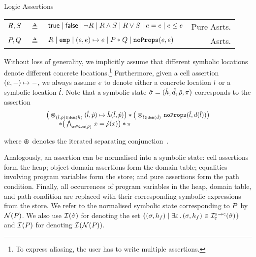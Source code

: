 
\vspace{2pt}
\begin{display}{\jsil Logic Assertions}
%
{\small
\begin{tabular}{r@{\ }c@{\ }lr}
  $R, S$ & $\triangleq$ & ${\sf true} \mid {\sf false} \mid  \neg R \mid R \land S \mid R \lor S \mid e = e \mid e \leq e$ & Pure Asrts. \\
  $P, Q$ & $\triangleq$ & $R \mid \texttt{emp} \mid (e, e)\mapsto e \mid P \mathbin{*} Q \mid \texttt{noProps}(e, e)$ & Asrts.
\end{tabular}}
\end{display}

\noindent Without loss of generality, we implicitly assume that different symbolic locations 
denote different concrete locations.\footnote{To express aliasing, the user has to write multiple assertions.}
 Furthermore, given a cell assertion $(e,-) \mapsto -$, we always assume 
 $e$ to denote either a concrete location $l$ or a symbolic location $\hat{l}$. 
%
Note that 
a symbolic state $\hat{\sigma} = (\hat{h}, \hat{d}, \hat\rho, \pi)$ corresponds to the assertion 
\begin{equation*}
{\small \begin{array}{l}
\big(\varoast_{(\sloc, \sexprp) \in \domain(\sheap)} (\sloc, \sexprp) \mapsto \sheap(\sloc, \sexprp)\big) 
  \sep \big(\varoast_{\sloc \in \domain(\sdom)} \, \emptyfields{\sloc}{\idom(\sloc)}\big)  \\
 \qquad \sep \big(\bigwedge_{\jvar \in \domain(\sstore)} \, \jvar = \sstore(\jvar)\big) \sep \pc
\end{array}}
\end{equation*}

\noindent where $\varoast$ denotes the iterated separating conjunction~\cite{citeme}. 


Analogously, an assertion can be normalised into a symbolic state: 
 cell assertions form the heap; 
object domain assertions form the domain table;
 equalities involving program variables form the store; and 
 pure assertions form the path condition. 
Finally,  all occurrences of program variables in the heap, domain table, and path condition 
are replaced with their corresponding symbolic expressions from the store. 
We refer to the normalised symbolic state corresponding 
to $P$ by $\mathcal{N}(P)$. 
%
We also use $\mathcal{I}^{}_{}(\hat{\sigma})$ for denoting the set 
$\{ (\jstate, \heap_f) \mid \exists \senv \, . \, (\jstate, \heap_f) \in \interpret{\symbconc}{\senv}(\sstate) \}$ 
and $\mathcal{I}^{}_{}(P)$ for denoting $\mathcal{I}^{}_{}(\mathcal{N}(P))$. 

